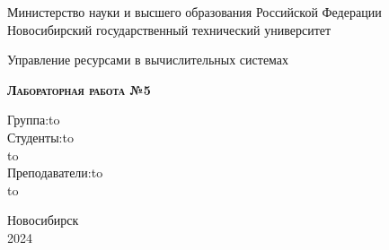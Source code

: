 \documentclass[a4paper,12pt]{article} %
\begin{document}
\begin{titlepage}
\newpage

\begin{center}
Министерство науки и высшего образования Российской Федерации \\
Новосибирский государственный технический университет
\end{center}

\vspace{8em}

\begin{center}
\Large Управление ресурсами в вычислительных системах \\ 
\end{center}

\vspace{2em}

\begin{center}
\textsc{\textbf{Лабораторная работа №5}}
\end{center}

\vspace{6em}



\newbox{\lbox}
\newlength{\maxl}
\setlength{\maxl}{\wd\lbox}
\hfill\parbox{11cm}{
\hspace*{5cm}\hspace*{-5cm}Группа:\hfill\hbox to\\
\hspace*{5cm}\hspace*{-5cm}Студенты:\hfill\hbox to\\
\hspace*{5cm}\hspace*{-5cm}\hfill\hbox to\\
\hspace*{5cm}\hspace*{-5cm}Преподаватели:\hfill\hbox to\\
\hspace*{5cm}\hspace*{-5cm}\hfill\hbox to\\
}


\vspace{\fill}

\begin{center}
Новосибирск \\2024
\end{center}

\end{titlepage}
\end{document}
